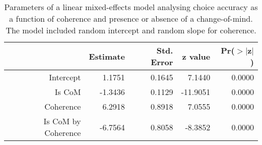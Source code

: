 \begin{table*}[t]
\centering
\caption{Parameters of a linear mixed-effects model analysing choice accuracy 
                            as a function of coherence and presence or absence of a change-of-mind. The model 
                            included random intercept and random slope for coherence.} 
\label{tab:is_correct_vs_coh}
\begin{tabular}{rrrrr}
  \toprule
 & Estimate & Std. Error & z value & Pr($>$$|$z$|$) \\ 
  \midrule
Intercept & 1.1751 & 0.1645 & 7.1440 & 0.0000 \\ 
  Is CoM & -1.3436 & 0.1129 & -11.9051 & 0.0000 \\ 
  Coherence & 6.2918 & 0.8918 & 7.0555 & 0.0000 \\ 
  Is CoM by Coherence & -6.7564 & 0.8058 & -8.3852 & 0.0000 \\ 
   \bottomrule
\end{tabular}
\end{table*}
